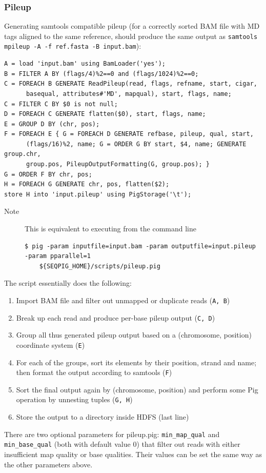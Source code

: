 \subsubsection{Pileup}
Generating samtools compatible pileup (for a correctly sorted BAM file
with MD tags aligned to the same reference, should produce the same output as
{\tt samtools mpileup -A -f ref.fasta -B input.bam}):
\begin{lstlisting}
A = load 'input.bam' using BamLoader('yes');
B = FILTER A BY (flags/4)%2==0 and (flags/1024)%2==0;
C = FOREACH B GENERATE ReadPileup(read, flags, refname, start, cigar,
      basequal, attributes#'MD', mapqual), start, flags, name;
C = FILTER C BY $0 is not null;
D = FOREACH C GENERATE flatten($0), start, flags, name;
E = GROUP D BY (chr, pos);
F = FOREACH E { G = FOREACH D GENERATE refbase, pileup, qual, start,
      (flags/16)%2, name; G = ORDER G BY start, $4, name; GENERATE group.chr,
      group.pos, PileupOutputFormatting(G, group.pos); }
G = ORDER F BY chr, pos;
H = FOREACH G GENERATE chr, pos, flatten($2);
store H into 'input.pileup' using PigStorage('\t');
\end{lstlisting}
\begin{description}
	\item[Note] This is equivalent to executing from the command line
\begin{lstlisting}
$ pig -param inputfile=input.bam -param outputfile=input.pileup -param pparallel=1
    ${SEQPIG_HOME}/scripts/pileup.pig
\end{lstlisting}
\end{description}
The script essentially does the following:
\begin{enumerate}
\item Import BAM file and filter out unmapped or duplicate reads ({\tt A, B})
\item Break up each read and produce per-base pileup output ({\tt C, D})
\item Group all thus generated pileup output based on a (chromosome, position)
coordinate system ({\tt E})
\item For each of the groups, sort its elements by their position, strand and name;
then format the output according to samtools ({\tt F})
\item Sort the final output again by (chromosome, position) and perform
some Pig operation by unnesting tuples ({\tt G, H})
\item Store the output to a directory inside HDFS (last line)
\end{enumerate}
There are two optional parameters for pileup.pig: {\tt min\_map\_qual} and
{\tt min\_base\_qual} (both with default value 0) that filter out reads with
either insufficient map quality or base qualities. Their values can
be set the same way as the other parameters above.

